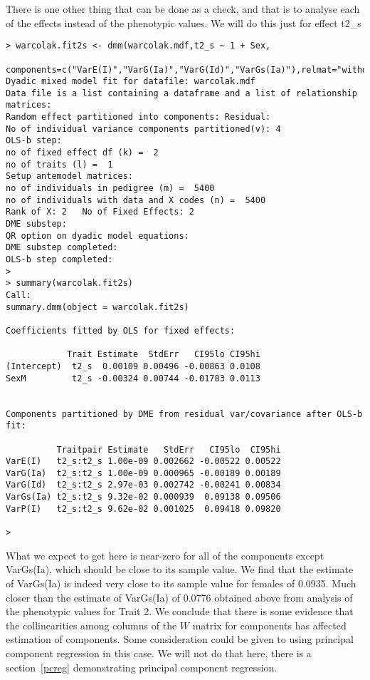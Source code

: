 \documentclass[titlepage]{article}  %
\begin{document}
 There is one other thing that can be done as a check, and that is to analyse each of the effects instead of the phenotypic values. We will do this just for effect t2\_s

\begin{verbatim}
> warcolak.fit2s <- dmm(warcolak.mdf,t2_s ~ 1 + Sex,
   components=c("VarE(I)","VarG(Ia)","VarG(Id)","VarGs(Ia)"),relmat="withdf")
Dyadic mixed model fit for datafile: warcolak.mdf  
Data file is a list containing a dataframe and a list of relationship matrices:
Random effect partitioned into components: Residual:
No of individual variance components partitioned(v): 4 
OLS-b step:
no of fixed effect df (k) =  2 
no of traits (l) =  1 
Setup antemodel matrices:
no of individuals in pedigree (m) =  5400 
no of individuals with data and X codes (n) =  5400 
Rank of X: 2   No of Fixed Effects: 2 
DME substep:
QR option on dyadic model equations:
DME substep completed:
OLS-b step completed:
>
> summary(warcolak.fit2s)
Call:
summary.dmm(object = warcolak.fit2s)

Coefficients fitted by OLS for fixed effects:

            Trait Estimate  StdErr   CI95lo CI95hi
(Intercept)  t2_s  0.00109 0.00496 -0.00863 0.0108
SexM         t2_s -0.00324 0.00744 -0.01783 0.0113


Components partitioned by DME from residual var/covariance after OLS-b fit:

          Traitpair Estimate   StdErr   CI95lo  CI95hi
VarE(I)   t2_s:t2_s 1.00e-09 0.002662 -0.00522 0.00522
VarG(Ia)  t2_s:t2_s 1.00e-09 0.000965 -0.00189 0.00189
VarG(Id)  t2_s:t2_s 2.97e-03 0.002742 -0.00241 0.00834
VarGs(Ia) t2_s:t2_s 9.32e-02 0.000939  0.09138 0.09506
VarP(I)   t2_s:t2_s 9.62e-02 0.001025  0.09418 0.09820

> 
\end{verbatim}
What we expect to get here is near-zero for all of the components except VarGs(Ia), which should be close to its sample value. We find that the estimate of VarGs(Ia) is indeed very close to its sample value for females of 0.0935. Much closer than the estimate of VarGs(Ia) of 0.0776 obtained above from analysis of the phenotypic values for Trait 2. We conclude that there is some evidence that the collinearities among columns of the $W$ matrix for components has affected estimation of components.  Some consideration could be given to using principal component regression in this case. We will not do that here, there is a section~\ref{pcreg} demonstrating principal component regression.
\end{document}
